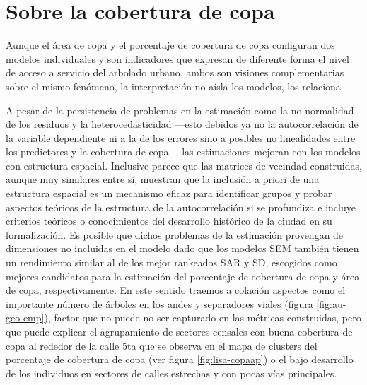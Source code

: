 \documentclass[12pt,]{book}
\begin{document}
\section{Sobre la cobertura de copa}\label{sobre-la-cobertura-de-copa}

Aunque el área de copa y el porcentaje de cobertura de copa configuran
dos modelos individuales y son indicadores que expresan de diferente
forma el nivel de acceso a servicio del arbolado urbano, ambos son
visiones complementarias sobre el mismo fenómeno, la interpretación no
aísla los modelos, los relaciona.

A pesar de la persistencia de problemas en la estimación como la no
normalidad de los residuos y la heterocedasticidad ---esto debidos ya no
la autocorrelación de la variable dependiente ni a la de los errores
sino a posibles no linealidades entre los predictores y la cobertura de
copa--- las estimaciones mejoran con los modelos con estructura
espacial. Inclusive parece que las matrices de vecindad construidas,
aunque muy similares entre sí, muestran que la inclusión a priori de una
estructura espacial es un mecanismo eficaz para identificar grupos y
probar aspectos teóricos de la estructura de la autocorrelación si se
profundiza e incluye criterios teóricos o conocimientos del desarrollo
histórico de la ciudad en su formalización. Es posible que dichos
problemas de la estimación provengan de dimensiones no incluidas en el
modelo dado que los modelos SEM también tienen un rendimiento similar al
de los mejor rankeados SAR y SD, escogidos como mejores candidatos para
la estimación del porcentaje de cobertura de copa y área de copa,
respectivamente. En este sentido traemos a colación aspectos como el
importante número de árboles en los andes y separadores viales (figura
\ref{fig:au-geo-emp}), factor que no puede no ser capturado en las
métricas construidas, pero que puede explicar el agrupamiento de
sectores censales con buena cobertura de copa al rededor de la calle 5ta
que se observa en el mapa de clusters del porcentaje de cobertura de
copa (ver figura \ref{fig:lisa-copaap}) o el bajo desarrollo de los
individuos en sectores de calles estrechas y con pocas vías principales.
\end{document}
